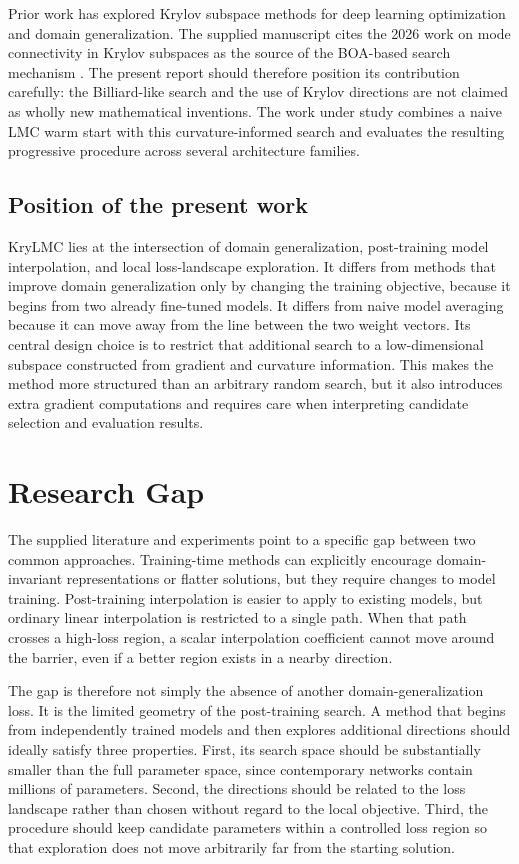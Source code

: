 \documentclass[11pt,a4paper]{article}
\begin{document}
Prior work has explored Krylov subspace methods for deep learning optimization and domain generalization. The supplied manuscript cites the 2026 work on mode connectivity in Krylov subspaces as the source of the BOA-based search mechanism \cite{li2026krylovboa}. The present report should therefore position its contribution carefully: the Billiard-like search and the use of Krylov directions are not claimed as wholly new mathematical inventions. The work under study combines a naive LMC warm start with this curvature-informed search and evaluates the resulting progressive procedure across several architecture families.

\subsection{Position of the present work}
KryLMC lies at the intersection of domain generalization, post-training model interpolation, and local loss-landscape exploration. It differs from methods that improve domain generalization only by changing the training objective, because it begins from two already fine-tuned models. It differs from naive model averaging because it can move away from the line between the two weight vectors. Its central design choice is to restrict that additional search to a low-dimensional subspace constructed from gradient and curvature information. This makes the method more structured than an arbitrary random search, but it also introduces extra gradient computations and requires care when interpreting candidate selection and evaluation results.

\section{Research Gap}

The supplied literature and experiments point to a specific gap between two common approaches. Training-time methods can explicitly encourage domain-invariant representations or flatter solutions, but they require changes to model training. Post-training interpolation is easier to apply to existing models, but ordinary linear interpolation is restricted to a single path. When that path crosses a high-loss region, a scalar interpolation coefficient cannot move around the barrier, even if a better region exists in a nearby direction.

The gap is therefore not simply the absence of another domain-generalization loss. It is the limited geometry of the post-training search. A method that begins from independently trained models and then explores additional directions should ideally satisfy three properties. First, its search space should be substantially smaller than the full parameter space, since contemporary networks contain millions of parameters. Second, the directions should be related to the loss landscape rather than chosen without regard to the local objective. Third, the procedure should keep candidate parameters within a controlled loss region so that exploration does not move arbitrarily far from the starting solution.
\end{document}
